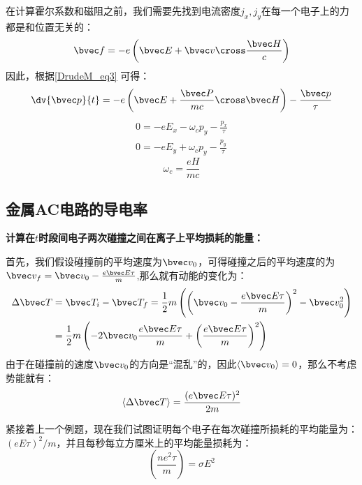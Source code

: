 在计算霍尔系数和磁阻之前，我们需要先找到电流密度$j_x,j_y$在每一个电子上的力都是和位置无关的：
\begin{equation}
\bvec f = -e\left(\bvec E +\bvec v\cross \frac{\bvec H}{c}\right)
\end{equation}
因此，根据\autoref{DrudeM_eq3} 可得：
\begin{equation}
\dv{\bvec p}{t}=-e\left(\bvec E +\frac{\bvec P}{mc}\cross \bvec H\right)-\frac{\bvec p}{\tau}
\end{equation}
\begin{align}
0=-eE_x-\omega_c p_y -\frac{p_x}{\tau}\\
0=-eE_y+\omega_c p_y -\frac{p_y}{\tau}
\end{align}
\begin{equation}
\omega_c = \frac{eH}{mc}
\end{equation}

\subsection{金属AC电路的导电率}

\begin{example}{}
\textbf{计算在$t$时段间电子两次碰撞之间在离子上平均损耗的能量：}

首先，我们假设碰撞前的平均速度为$\bvec v_0$，可得碰撞之后的平均速度的为$\bvec v_f=\bvec v_0 -\frac{e\bvec E \tau}{m}$,那么就有动能的变化为：
\begin{align}
\Delta \bvec T &= \bvec T_i-\bvec T_f=\frac{1}{2}m\left(\left(\bvec v_0 -\frac{e\bvec E \tau}{m}\right)^2-\bvec v_0^2\right)\\
&=\frac{1}{2}m\left(-2\bvec v_0\frac{e\bvec E \tau}{m}+\left(\frac{e\bvec E \tau}{m}\right)^2\right)\\
\end{align}
由于在碰撞前的速度$\bvec v_0$的方向是“混乱”的，因此$\langle \bvec v_0\rangle = 0$，那么不考虑势能就有：
\begin{equation}
\langle \Delta \bvec T \rangle = \frac{(e\bvec E \tau)^2}{2m}
\end{equation}
\end{example}
\begin{exercise}{}
紧接着上一个例题，现在我们试图证明每个电子在每次碰撞所损耗的平均能量为：$(eE\tau)^2/m$，并且每秒每立方厘米上的平均能量损耗为：
\begin{equation}
\left(\frac{ne^2\tau}{m}\right)=\sigma E^2
\end{equation}

\end{exercise}





